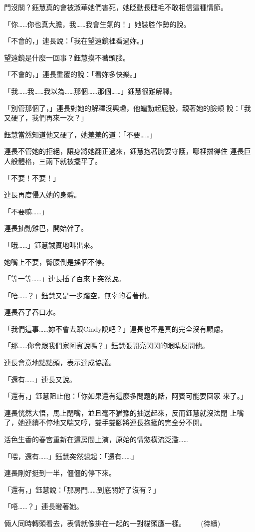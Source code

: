 門沒關？鈺慧真的會被淑華她們害死，她眨動長睫毛不敢相信這種情節。

「你……你也真大膽，我……我會生氣的！」她裝腔作勢的說。

「不會的，」連長說：「我在望遠鏡裡看過妳。」

望遠鏡是什麼一回事？鈺慧摸不著頭腦。

「不會的，」連長重覆的說：「看妳多快樂。」

「我……我……我以為……那個……那個……」鈺慧很難解釋。

「別管那個了，」連長對她的解釋沒興趣，他蠕動起屁股，親著她的臉頰
說：「我又硬了，我們再來一次？」

鈺慧當然知道他又硬了，她羞羞的道：「不要……」

連長不管她的拒絕，讓身將她翻正過來，鈺慧抱著胸要守護，哪裡擋得住
連長巨人般體格，三兩下就被擺平了。

「不要！不要！」

連長再度侵入她的身體。

「不要嘛……」

連長抽動雞巴，開始幹了。

「哦……」鈺慧誠實地叫出來。

她嘴上不要，臀腰倒是搖個不停。

「等一等……」連長插了百來下突然說。

「唔……？」鈺慧又是一步踏空，無辜的看著他。

連長吞了吞口水。

「我們這事……妳不會去跟Cindy說吧？」連長也不是真的完全沒有顧慮。

「那……你會跟我們家阿賓說嗎？」鈺慧張開亮閃閃的眼睛反問他。

連長會意地點點頭，表示達成協議。

「還有……」連長又說。

「還有，」鈺慧阻止他：「你如果還有這麼多問題的話，阿賓可能要回家
來了。」

連長恍然大悟，馬上閉嘴，並且毫不猶豫的抽送起來，反而鈺慧就沒法閉
上嘴了，她連續不停地又喘又哼，雙手雙腳將連長抱箍的完全分不開。

活色生香的春宮重新在這房間上演，原始的情慾橫流泛濫……

「喂，還有……」鈺慧突然想起：「還有……」

連長剛好挺到一半，僵僵的停下來。

「還有，」鈺慧說：「那房門……到底關好了沒有？」

「唔……？」連長瞪著她。

倆人同時轉頭看去，表情就像排在一起的一對貓頭鷹一樣。　
　
(待續)










